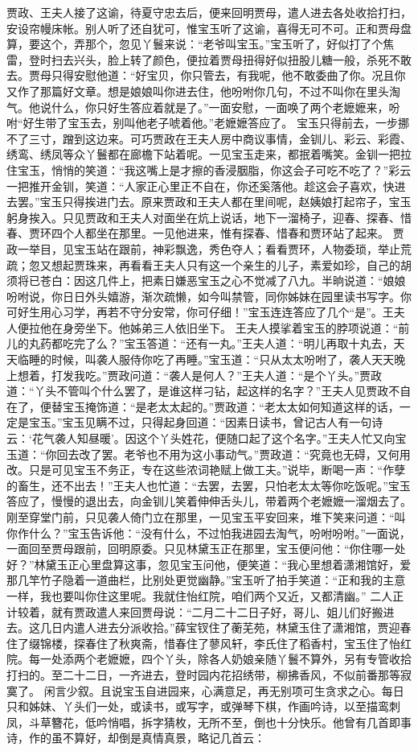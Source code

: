 \documentclass[12pt,oneside]{book}
\begin{document}
贾政、王夫人接了这谕，待夏守忠去后，便来回明贾母，遣人进去各处收拾打扫，安设帘幔床帐。别人听了还自犹可，惟宝玉听了这谕，喜得无可不可。正和贾母盘算，要这个，弄那个，忽见丫鬟来说：“老爷叫宝玉。”宝玉听了，好似打了个焦雷，登时扫去兴头，脸上转了颜色，便拉着贾母扭得好似扭股儿糖一般，杀死不敢去。贾母只得安慰他道：“好宝贝，你只管去，有我呢，他不敢委曲了你。况且你又作了那篇好文章。想是娘娘叫你进去住，他吩咐你几句，不过不叫你在里头淘气。他说什么，你只好生答应着就是了。”一面安慰，一面唤了两个老嬷嬷来，吩咐“好生带了宝玉去，别叫他老子唬着他。”老嬷嬷答应了。
宝玉只得前去，一步挪不了三寸，蹭到这边来。可巧贾政在王夫人房中商议事情，金钏儿、彩云、彩霞、绣鸾、绣凤等众丫鬟都在廊檐下站着呢。一见宝玉走来，都抿着嘴笑。金钏一把拉住宝玉，悄悄的笑道：“我这嘴上是才擦的香浸胭脂，你这会子可吃不吃了？”彩云一把推开金钏，笑道：“人家正心里正不自在，你还奚落他。趁这会子喜欢，快进去罢。”宝玉只得挨进门去。原来贾政和王夫人都在里间呢，赵姨娘打起帘子，宝玉躬身挨入。只见贾政和王夫人对面坐在炕上说话，地下一溜椅子，迎春、探春、惜春、贾环四个人都坐在那里。一见他进来，惟有探春、惜春和贾环站了起来。
贾政一举目，见宝玉站在跟前，神彩飘逸，秀色夺人；看看贾环，人物委琐，举止荒疏；忽又想起贾珠来，再看看王夫人只有这一个亲生的儿子，素爱如珍，自己的胡须将已苍白：因这几件上，把素日嫌恶宝玉之心不觉减了八九。半晌说道：“娘娘吩咐说，你日日外头嬉游，渐次疏懒，如今叫禁管，同你姊妹在园里读书写字。你可好生用心习学，再若不守分安常，你可仔细！”宝玉连连答应了几个“是”。王夫人便拉他在身旁坐下。他姊弟三人依旧坐下。
王夫人摸挲着宝玉的脖项说道：“前儿的丸药都吃完了么？”宝玉答道：“还有一丸。”王夫人道：“明儿再取十丸去，天天临睡的时候，叫袭人服侍你吃了再睡。”宝玉道：“只从太太吩咐了，袭人天天晚上想着，打发我吃。”贾政问道：“袭人是何人？”王夫人道：“是个丫头。”贾政道：“丫头不管叫个什么罢了，是谁这样刁钻，起这样的名字？”王夫人见贾政不自在了，便替宝玉掩饰道：“是老太太起的。”贾政道：“老太太如何知道这样的话，一定是宝玉。”宝玉见瞒不过，只得起身回道：“因素日读书，曾记古人有一句诗云：‘花气袭人知昼暖’。因这个丫头姓花，便随口起了这个名字。”王夫人忙又向宝玉道：“你回去改了罢。老爷也不用为这小事动气。”贾政道：“究竟也无碍，又何用改。只是可见宝玉不务正，专在这些浓词艳赋上做工夫。”说毕，断喝一声：“作孽的畜生，还不出去！”王夫人也忙道：“去罢，去罢，只怕老太太等你吃饭呢。”宝玉答应了，慢慢的退出去，向金钏儿笑着伸伸舌头儿，带着两个老嬷嬷一溜烟去了。
刚至穿堂门前，只见袭人倚门立在那里，一见宝玉平安回来，堆下笑来问道：“叫你作什么？”宝玉告诉他：“没有什么，不过怕我进园去淘气，吩咐吩咐。”一面说，一面回至贾母跟前，回明原委。只见林黛玉正在那里，宝玉便问他：“你住哪一处好？”林黛玉正心里盘算这事，忽见宝玉问他，便笑道：“我心里想着潇湘馆好，爱那几竿竹子隐着一道曲栏，比别处更觉幽静。”宝玉听了拍手笑道：“正和我的主意一样，我也要叫你住这里呢。我就住怡红院，咱们两个又近，又都清幽。”
二人正计较着，就有贾政遣人来回贾母说：“二月二十二日子好，哥儿、姐儿们好搬进去。这几日内遣人进去分派收拾。”薛宝钗住了蘅芜苑，林黛玉住了潇湘馆，贾迎春住了缀锦楼，探春住了秋爽斋，惜春住了蓼风轩，李氏住了稻香村，宝玉住了怡红院。每一处添两个老嬷嬷，四个丫头，除各人奶娘亲随丫鬟不算外，另有专管收拾打扫的。至二十二日，一齐进去，登时园内花招绣带，柳拂香风，不似前番那等寂寞了。
闲言少叙。且说宝玉自进园来，心满意足，再无别项可生贪求之心。每日只和姊妹、丫头们一处，或读书，或写字，或弹琴下棋，作画吟诗，以至描鸾刺凤，斗草簪花，低吟悄唱，拆字猜枚，无所不至，倒也十分快乐。他曾有几首即事诗，作的虽不算好，却倒是真情真景，略记几首云：
\end{document}
